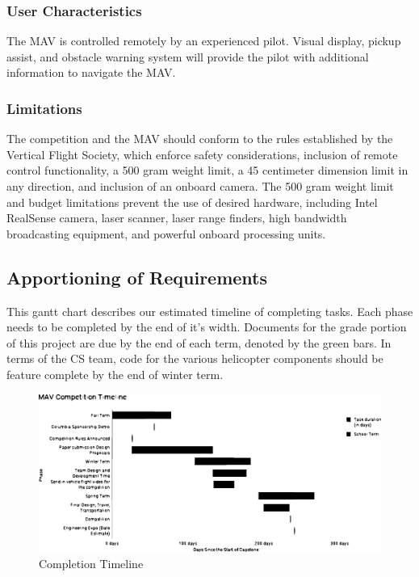 \documentclass[onecolumn, oneside, letterpaper, draftclsnofoot, 10pt, compsoc]{IEEEtran}
\begin{document}
\subsubsection{User Characteristics}
The MAV is controlled remotely by an experienced pilot. Visual display, pickup assist, and obstacle warning system will provide the pilot with additional information to navigate the MAV.

\subsubsection{Limitations}
The competition and the MAV should conform to the rules established by the Vertical Flight Society, which enforce safety considerations, inclusion of remote control functionality, a 500 gram weight limit, a 45 centimeter dimension limit in any direction, and inclusion of an onboard camera. The 500 gram weight limit and budget limitations prevent the use of desired hardware, including Intel RealSense camera, laser scanner, laser range finders, high bandwidth broadcasting equipment, and powerful onboard processing units.

\subsection{Apportioning of Requirements}
This gantt chart describes our estimated timeline of completing tasks. Each phase needs to be completed by the end of it’s width. Documents for the grade portion of this project are due by the end of each term, denoted by the green bars. In terms of the CS team, code for the various helicopter components should be feature complete by the end of winter term.
\begin{figure}[h!]
\centering
\includegraphics[width=1.0\textwidth]{graphics/completion_timeline.eps}
\caption{Completion Timeline}
\end{figure}
\end{document}

